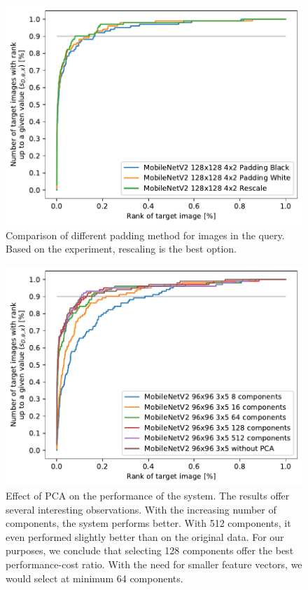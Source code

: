 \begin{figure}
    \centering
    \includegraphics[width=0.8\linewidth]{graphs/bf57efafbbbc7b5a1744054d87d4ecfa381c9eaf2459186904190d97bcb99a81.pdf}
    \caption{Comparison of different padding method for images in the query. Based on the experiment, rescaling is the best option.}
    \label{fig:padding}
\end{figure}

\begin{figure}
    \centering
    \includegraphics[width=0.8\linewidth]{graphs/6fbd4f70810e1f63f400ef601c1cdba0fd1635749810aa2347a4ff26e6fccf47.pdf}
    \caption{Effect of PCA on the performance of the system. The results offer several interesting observations. With the increasing number of components, the system performs better. With 512 components, it even performed slightly better than on the original data. For our purposes, we conclude that selecting 128 components offer the best performance-cost ratio. With the need for smaller feature vectors, we would select at minimum 64 components.}
    \label{fig:pca}
\end{figure}

